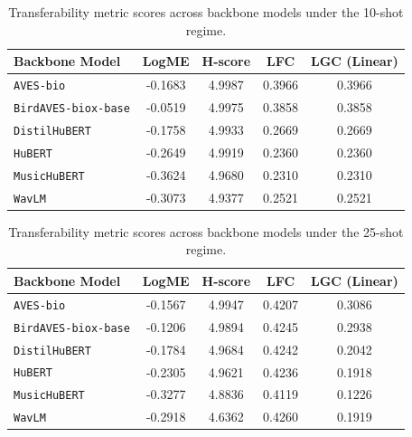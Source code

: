 \begin{table}[htbp]
\centering
\caption{Transferability metric scores across backbone models under the 10-shot regime.}
\label{tab:transferability_10_shot}
\begin{tabular}{lcccc}
\hline
\textbf{Backbone Model} & \textbf{LogME} & \textbf{H-score} & \textbf{LFC} & \textbf{LGC (Linear)} \\ \hline
\texttt{AVES-bio} & -0.1683 & 4.9987 & 0.3966 & 0.3966 \\
\texttt{BirdAVES-biox-base} & -0.0519 & 4.9975 & 0.3858 & 0.3858 \\
\texttt{DistilHuBERT} & -0.1758 & 4.9933 & 0.2669 & 0.2669 \\
\texttt{HuBERT} & -0.2649 & 4.9919 & 0.2360 & 0.2360 \\
\texttt{MusicHuBERT} & -0.3624 & 4.9680 & 0.2310 & 0.2310 \\
\texttt{WavLM} & -0.3073 & 4.9377 & 0.2521 & 0.2521 \\
\hline
\end{tabular}
\end{table}


\begin{table}[htbp]
\centering
\caption{Transferability metric scores across backbone models under the 25-shot regime.}
\label{tab:transferability_25_shot}
\begin{tabular}{lcccc}
\hline
\textbf{Backbone Model} & \textbf{LogME} & \textbf{H-score} & \textbf{LFC} & \textbf{LGC (Linear)} \\ \hline
\texttt{AVES-bio} & -0.1567 & 4.9947 & 0.4207 & 0.3086 \\
\texttt{BirdAVES-biox-base} & -0.1206 & 4.9894 & 0.4245 & 0.2938 \\
\texttt{DistilHuBERT} & -0.1784 & 4.9684 & 0.4242 & 0.2042 \\
\texttt{HuBERT} & -0.2305 & 4.9621 & 0.4236 & 0.1918 \\
\texttt{MusicHuBERT} & -0.3277 & 4.8836 & 0.4119 & 0.1226 \\
\texttt{WavLM} & -0.2918 & 4.6362 & 0.4260 & 0.1919 \\
\hline
\end{tabular}
\end{table}

